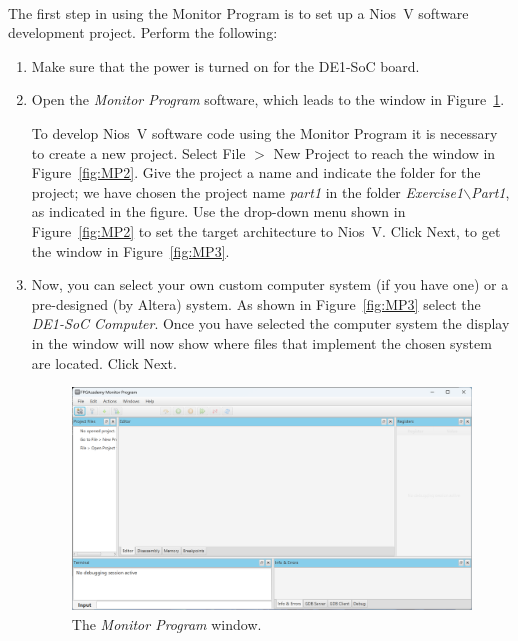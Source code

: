 \documentclass[epsfig,10pt,fullpage]{article}
\begin{document}
~\\
\noindent
The first step in using the Monitor Program is to set up a Nios~V software development
project.  Perform the following:
\begin{enumerate}
\item Make sure that the power is turned on for the DE1-SoC board.
\item Open the {\it Monitor Program} software, which leads to the window in Figure~\ref{fig:MP1}.

\noindent
To develop Nios~V software code using the Monitor Program it is necessary to create a new project.
Select {\sf File $>$ New Project} to reach the window in Figure~\ref{fig:MP2}.
Give the project a name and indicate the folder for the project; 
we have chosen the project name {\it part1} in the folder {\it Exercise1$\backslash$Part1},
as indicated in the figure. Use the drop-down menu shown in Figure~\ref{fig:MP2} to set
the target architecture to Nios~V.
Click {\sf Next}, to get the window in Figure~\ref{fig:MP3}.

\item Now, you can select your own custom computer system (if you have one) or a 
pre-designed (by Altera) system. As shown in Figure~\ref{fig:MP3} select the 
{\it DE1-SoC Computer}. Once you have selected the computer system the display in the window 
will now show where files that implement the chosen system are located. 
Click {\sf Next}.

\begin{figure}[H]
	\begin{center}
	\includegraphics[scale=.33]{figures/Snap1.png}
	\end{center}
	\caption{The {\it Monitor Program} window.}
\label{fig:MP1}
\end{figure}


\end{enumerate}
\end{document}
